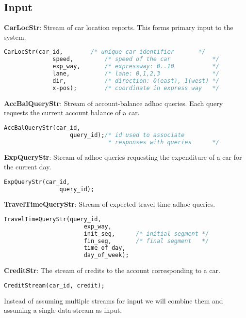 \subsection{Input}
\textbf{CarLocStr}: Stream of car location reports. This forms primary input to the system. 
\begin{lstlisting}[language=SQL]
    CarLocStr(car_id,        /* unique car identifier       */
              speed,         /* speed of the car            */
              exp_way,       /* expressway: 0..10           */
              lane,          /* lane: 0,1,2,3               */ 
              dir,           /* direction: 0(east), 1(west) */
              x-pos);        /* coordinate in express way   */
\end{lstlisting}
\textbf{AccBalQueryStr}: Stream of account-balance adhoc queries. Each query requests the current account balance of a car. 
\begin{lstlisting}[language=SQL]
    AccBalQueryStr(car_id,   
                   query_id);/* id used to associate 
                              * responses with queries      */
\end{lstlisting}
\textbf{ExpQueryStr}: Stream of adhoc queries requesting the expenditure of a car for the current day. 
\begin{lstlisting}[language=SQL]
    ExpQueryStr(car_id,
                query_id);
\end{lstlisting}
\textbf{TravelTimeQueryStr}: Stream of expected-travel-time adhoc queries. 
\begin{lstlisting}[language=SQL]
    TravelTimeQueryStr(query_id,
                       exp_way,
                       init_seg,      /* initial segment */
                       fin_seg,       /* final segment   */
                       time_of_day,   
                       day_of_week);
\end{lstlisting}
\textbf{CreditStr}: The stream of credits to the account corresponding to a car. 
\begin{lstlisting}[language=SQL]                   
    CreditStream(car_id, credit);
\end{lstlisting}
Instead of assuming multiple streams for input we will combine them and assuming a single data stream as input.

